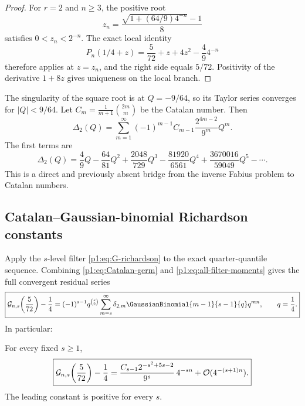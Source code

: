 \documentclass[11pt,oneside]{article}
\numberwithin{equation}{section}
\theoremstyle{definition}
\theoremstyle{remark}
\begin{document}
\begin{proof}
For $r=2$ and $n\ge3$, the positive root
\[
 z_n=\frac{\sqrt{1+(64/9)4^{-n}}-1}{8}
\]
satisfies $0<z_n<2^{-n}$.  The exact local identity
\[
 P_n(1/4+z)=\frac5{72}+z+4z^2-\frac49 4^{-n}
\]
therefore applies at $z=z_n$, and the right side equals $5/72$.  Positivity of
the derivative $1+8z$ gives uniqueness on the local branch.
\end{proof}

The singularity of the square root is at $Q=-9/64$, so its Taylor series converges
for $|Q|<9/64$.  Let $C_m=\frac1{m+1}\binom{2m}{m}$ be the Catalan number.
Then
\begin{equation}
 \boxed{
 \Delta_2(Q)=\sum_{m=1}^{\infty}
 (-1)^{m-1}C_{m-1}\frac{2^{4m-2}}{9^m}Q^m.}
 \label{p1:eq:Catalan-germ}
\end{equation}
The first terms are
\begin{equation}
 \Delta_2(Q)=\frac49Q-\frac{64}{81}Q^2
 +\frac{2048}{729}Q^3-\frac{81920}{6561}Q^4
 +\frac{3670016}{59049}Q^5-\cdots.
 \label{p1:eq:Catalan-first}
\end{equation}
This is a direct and previously absent bridge from the inverse Fabius problem to Catalan
numbers.

\subsection{Catalan--Gaussian-binomial Richardson constants}

Apply the $s$-level filter \eqref{p1:eq:G-richardson} to the exact quarter-quantile
sequence.  Combining \eqref{p1:eq:Catalan-germ} and
\eqref{p1:eq:all-filter-moments} gives the full convergent residual series
\begin{equation}
 \boxed{
 \mathcal G_{n,s}\!\left(\frac5{72}\right)-\frac14
 =(-1)^{s-1}q^{\binom s2}
 \sum_{m=s}^{\infty}
 \delta_{2,m}\GaussianBinomial{m-1}{s-1}{q}q^{mn},
 \qquad q=\frac14.}
 \label{p1:eq:Catalan-qbinom-full}
\end{equation}
In particular:

\begin{corollary}
\label{p1:cor:Catalan-Richardson}
For every fixed $s\ge1$,
\begin{equation}
 \boxed{
 \mathcal G_{n,s}\!\left(\frac5{72}\right)-\frac14
 =\frac{C_{s-1}2^{-s^2+5s-2}}{9^s}\,4^{-sn}
 +\mathcal O(4^{-(s+1)n}).}
 \label{p1:eq:Catalan-Richardson}
\end{equation}
The leading constant is positive for every $s$.
\end{corollary}
\end{document}

